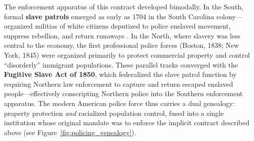 \documentclass[12pt,openany]{book}
\begin{document}
The enforcement apparatus of this contract developed bimodally. In the South, formal \textbf{slave patrols} emerged as early as 1704 in the South Carolina colony---organized militias of white citizens deputized to police enslaved movement, suppress rebellion, and return runaways \cite{hadden}. In the North, where slavery was less central to the economy, the first professional police forces (Boston, 1838; New York, 1845) were organized primarily to protect commercial property and control ``disorderly'' immigrant populations. These parallel tracks converged with the \textbf{Fugitive Slave Act of 1850}, which federalized the slave patrol function by requiring Northern law enforcement to capture and return escaped enslaved people---effectively conscripting Northern police into the Southern enforcement apparatus. The modern American police force thus carries a dual genealogy: property protection \textit{and} racialized population control, fused into a single institution whose original mandate was to enforce the implicit contract described above (see Figure~\ref{fig:policing_genealogy}).
\end{document}
